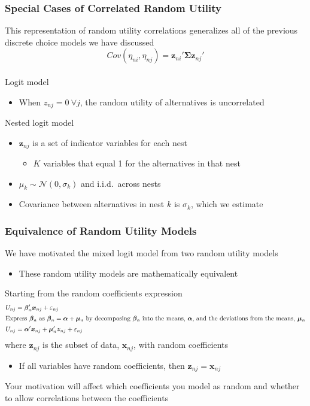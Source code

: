 \documentclass{beamer}
\begin{document}
\begin{frame}\frametitle{Special Cases of Correlated Random Utility}
    This representation of random utility correlations generalizes all of the previous discrete choice models we have discussed
    $$Cov(\eta_{ni}, \eta_{nj}) = \bm{z}_{ni}' \bm{\Sigma} \bm{z}_{nj}'$$ \\
    \vspace{2ex}
    Logit model
    \begin{itemize}
    	\item When $z_{nj} = 0 ~\forall j$, the random utility of alternatives is uncorrelated
    \end{itemize}
    \vspace{2ex}
    Nested logit model
    \begin{itemize}
    	\item $\bm{z}_{nj}$ is a set of indicator variables for each nest
    	\begin{itemize}
    		\item $K$ variables that equal 1 for the alternatives in that nest
    	\end{itemize}
    	\item $\mu_k \sim \mathcal{N}(0, \sigma_k)$ and i.i.d.\ across nests
    	\item Covariance between alternatives in nest $k$ is $\sigma_k$, which we estimate
    \end{itemize}
\end{frame}

\begin{frame}\frametitle{Equivalence of Random Utility Models}
    We have motivated the mixed logit model from two random utility models
    \begin{itemize}
    	\item These random utility models are mathematically equivalent
    \end{itemize}
    \vspace{2ex}
    Starting from the random coefficients expression
    \begin{align*}
        U_{nj} & = \bm{\beta}_n' \bm{x}_{nj} + \varepsilon_{nj} \\
        \intertext{Express $\bm{\beta}_n$ as $\bm{\beta}_n = \bm{\alpha} + \bm{\mu}_n$ by decomposing $\bm{\beta}_n$ into the means, $\bm{\alpha}$, and the deviations from the means, $\bm{\mu}_n$}
        U_{nj} & = \bm{\alpha}' \bm{x}_{nj} + \bm{\mu}_n' \bm{z}_{nj} + \varepsilon_{nj}
    \end{align*}
    where $\bm{z}_{nj}$ is the subset of data, $\bm{x}_{nj}$, with random coefficients
    \begin{itemize}
    	\item If all variables have random coefficients, then $\bm{z}_{nj} = \bm{x}_{nj}$
    \end{itemize}
    \vspace{2ex}
    Your motivation will affect which coefficients you model as random and whether to allow correlations between the coefficients
\end{frame}
\end{document}
